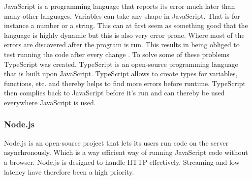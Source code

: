 JavaScript is a programming language that reports its error much later than many other languages. Variables can take any shape in JavaScript. That is for instance a number or a string. This can at first seem as something good that the language is highly dynamic but this is also very error prone. Where most of the errors are discovered after the program is run. This results in being obliged to test running the code after every change \cite{taivalsaari2008web}. To solve some of these problems TypeScript was created. TypeScript is an open-source programming language that is built upon JavaScript. TypeScript allows to create types for variables, functions, etc. and thereby helps to find more errors before runtime. TypeScript then complies back to JavaScript before it's run and can thereby be used everywhere JavaScript is used.





\subsubsection{Node.js}%
\label{ssub:Node}
Node.js is an open-source project that lets its users run code on the server asynchronously. Which is a way efficient way of running JavaScript code without a browser. Node.js is designed to handle HTTP effectively. Streaming and low latency have therefore been a high priority.



